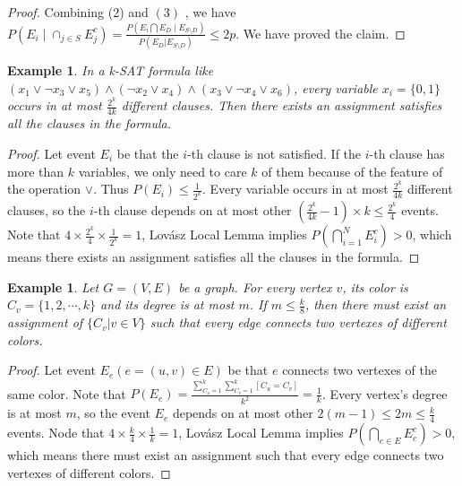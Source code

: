 \documentclass{article}
\newtheorem{example}[theorem]{Example}
\begin{document}
\begin{proof}
Combining (2) and $(3)$ , we have $ P\left(E_i\mid \cap_{j\in S}E_j^c\right) = \frac{P\left(E_i \bigcap E_D\mid E_{S\setminus D}\right)}
        {P\left(E_D| E_{S\setminus D}\right)}\leq 2p$. We have proved the claim.
\end{proof}

\begin{tcolorbox}
    \begin{example}
       In a k-SAT formula like $(x_1 \vee \neg x_3 \vee x_5) \wedge (\neg x_2 \vee x_4) \wedge (x_3 \vee \neg x_4 \vee x_6)$, every variable $x_i=\{0, 1\}$ occurs in at most $\frac{2^k}{4k}$ different clauses. Then there exists an assignment satisfies all the clauses in the formula.
   \end{example}
\end{tcolorbox}

\begin{proof}
Let event $E_i$ be that the $i$-th clause is not satisfied. If the $i$-th clause has more than $k$ variables, we only need to care $k$ of them because of the feature of the operation $\vee$. Thus $P(E_i) \leq \frac{1}{2^k}$. Every variable occurs in at most $\frac{2^k}{4k}$ different clauses, so the $i$-th clause depends on at most other $(\frac{2^k}{4k}-1)\times k\leq \frac{2^k}{4}$ events. Note that $4\times\frac{2^k}{4}\times\frac{1}{2^k} = 1$, Lovász Local Lemma implies $P\left(\bigcap_{i=1}^N E_i^c\right)>0$, which means there exists an assignment satisfies all the clauses in the formula.
\end{proof}

\begin{tcolorbox}
    \begin{example}
       Let $G=(V,E)$ be a graph. For every vertex $v$, its color is $C_v=\{1,2,\cdots,k\}$ and its degree is at most $m$. If $m\leq \frac{k}{8}$, then there must exist an assignment of $\{C_v|v\in V\}$ such that every edge connects two vertexes of different colors.    
   \end{example}
\end{tcolorbox}

\begin{proof}
Let event $E_e(e=(u,v)\in E)$ be that $e$ connects two vertexes of the same color. Note that $P(E_e) = \frac{\sum_{C_u=1}^k\sum_{C_v=1}^k[C_u=C_v]}{k^2}=\frac{1}{k}$. Every vertex's degree is at most $m$, so the event $E_e$ depends on at most other $2(m -1)\leq 2m \leq \frac{k}{4}$ events. Node that $4\times\frac{k}{4}\times\frac{1}{k}=1$,  Lovász Local Lemma implies $P\left(\bigcap_{e\in E} E_e^c\right)>0$, which means there must exist an assignment  such that every edge connects two vertexes of different colors. 
\end{proof}
\end{document}
